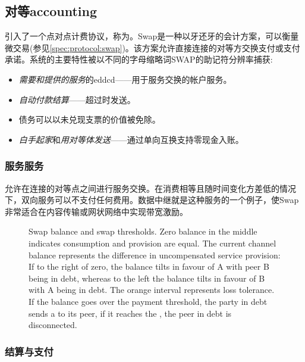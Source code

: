 \subsection{对等accounting\statusgreen}\label{sec:accounting}


\cite{ethersphere2016sw3}引入了一个点对点计费协议，称为。Swap是一种以牙还牙的会计方案，可以衡量微交易(参见\ref{spec:protocol:swap})。该方案允许直接连接的对等方交换支付或支付承诺。系统的主要特性被以不同的字母缩略词SWAP的助记符分辨率捕获:

\begin{itemize}
    \item \emph{需要和提供的服务}的eddcd——用于服务交换的帐户服务。
    \item \emph{自动付款结算}——超过时发送。
    \item 债务可以以未兑现支票的价值被免除。 
    \item \emph{白手起家}和\emph{用对等体发送}——通过单向互换支持零现金入账。
\end{itemize}

\subsubsection{服务服务}

允许在连接的对等点之间进行服务交换。在消费相等且随时间变化方差低的情况下，双向服务可以不支付任何费用。数据中继就是这种服务的一个例子，使Swap非常适合在内容传输或网状网络中实现带宽激励。

\begin{figure}[htbp]

\caption[Swap balance and swap thresholds \statusgreen]{Swap balance and swap thresholds.
Zero balance in the middle indicates consumption and provision are equal.
The current channel balance represents the difference in uncompensated service provision:
If to the right of zero, the balance tilts in favour of A with peer B being in debt, whereas to the left
the balance tilts in favour of B with A being in debt.
The orange interval represents loss tolerance. If the balance goes over the payment threshold, the party in
debt sends a  to its peer, if it reaches the , the peer in debt is disconnected.}
\label{fig:swap}
\end{figure}

\subsubsection{结算与支付}

